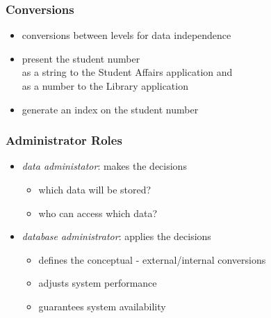 \documentclass[dvipsnames]{beamer}
\theoremstyle{plain}
\begin{document}
\begin{frame}
  \frametitle{Conversions}

  \begin{itemize}
    \item conversions between levels for data independence
  \end{itemize}

  \pause
  \begin{example}
    \begin{itemize}
      \item present the student number\\
        as a string to the Student Affairs application and\\
        as a number to the Library application
    \end{itemize}
  \end{example}

  \pause
  \begin{example}
    \begin{itemize}
      \item generate an index on the student number
    \end{itemize}
  \end{example}
\end{frame}

\begin{frame}
  \frametitle{Administrator Roles}

  \begin{itemize}
    \item \emph{data administator}: makes the decisions
    \begin{itemize}
      \item which data will be stored?
      \item who can access which data?
    \end{itemize}

    \pause
    \bigskip
    \item \emph{database administrator}: applies the decisions
    \begin{itemize}
      \item defines the conceptual - external/internal conversions
      \item adjusts system performance
      \item guarantees system availability
    \end{itemize}
  \end{itemize}
\end{frame}
\end{document}
